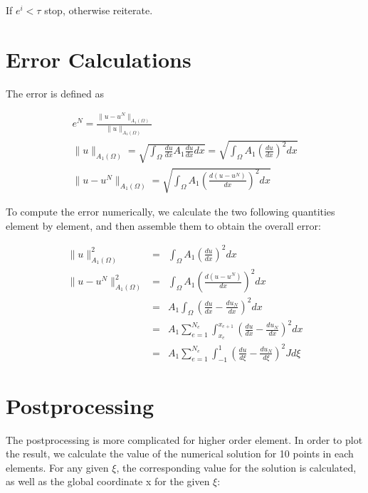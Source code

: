 \documentclass[paper=a4, fontsize=11pt]{article} %
\begin{document}
If $e^i < \tau$ stop, otherwise reiterate. 

\section{Error Calculations}
The error is defined as 

\begin{eqnarray}
e^N = \frac{\| u -u^N \| _{A_1(\Omega)}} {\| u \| _{A_1 (\Omega)}} \nonumber\\
\| u \| _{A_1 (\Omega)} = \sqrt{\int_{\Omega} \frac{du}{dx} A_1 \frac{du}{dx} dx} = \sqrt{\int_{\Omega} A_1(\frac{du}{dx})^2 dx}\nonumber\\
\| u -u^N \| _{A_1(\Omega)} = \sqrt{\int_{\Omega} A_1 (\frac{d(u-u^N)}{dx})^2 dx}
\end{eqnarray}

To compute the error numerically, we calculate the two following quantities element by element, and then assemble them to obtain the overall error:

\begin{eqnarray}
\| u \| _{A_1 (\Omega)}^2 &=&\int_{\Omega} A_1(\frac{du}{dx})^2 dx\nonumber\\
\| u -u^N \| _{A_1(\Omega)} ^2 &=& \int_{\Omega} A_1 (\frac{d(u-u^N)}{dx})^2 dx\nonumber\\
&=& A_1 \int_{\Omega} (\frac{du}{dx} - \frac{du_N}{dx})^2 dx\nonumber\\
&=& A_1 \sum_{e=1}^{N_e} \int_{x_e}^{x_{e+1}} (\frac{du}{dx} - \frac{du_N}{dx})^2 dx \nonumber\\
&=& A_1 \sum_{e=1}^{N_e} \int_{-1}^{1} (\frac{du}{d\xi} - \frac{du_N}{d\xi})^2 J d\xi
\end{eqnarray}

\section{Postprocessing}
The postprocessing is more complicated for higher order element. In order to plot the result, we calculate the value of the numerical solution for 10 points in each elements. For any given $\xi$, the corresponding value for the solution is calculated, as well as the global coordinate x for the given $\xi$:
\end{document}
